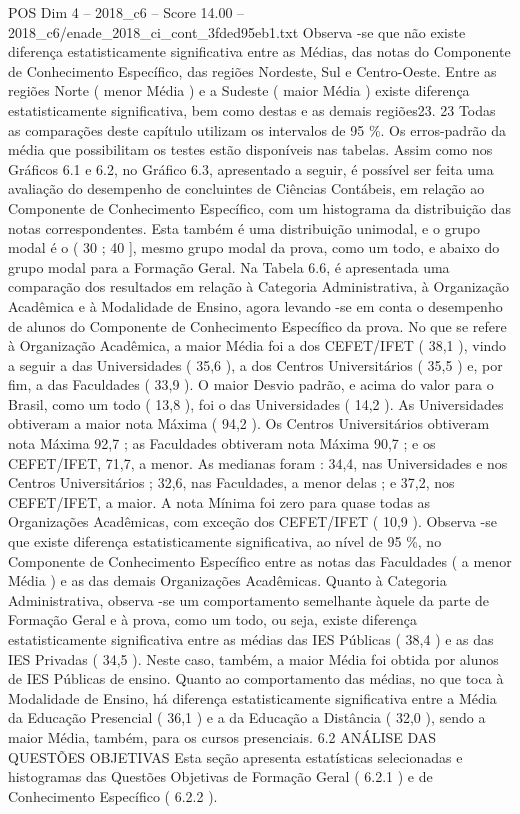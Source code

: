 \begin{textsample}{POS Dim 4 – 2018\_c6 – Score 14.00 – 2018\_c6/enade\_2018\_ci\_cont\_3fded95eb1.txt}
Observa -se que não existe diferença estatisticamente significativa entre as Médias, das notas do Componente de Conhecimento Específico, das regiões Nordeste, Sul e Centro-Oeste.
Entre as regiões Norte ( menor Média ) e a Sudeste ( maior Média ) existe diferença estatisticamente significativa, bem como destas e as demais regiões23. 23 Todas as comparações deste capítulo utilizam os intervalos de 95 \%.
Os erros-padrão da média que possibilitam os testes estão disponíveis nas tabelas.
Assim como nos Gráficos 6.1 e 6.2, no Gráfico 6.3, apresentado a seguir, é possível ser feita uma avaliação do desempenho de concluintes de Ciências Contábeis, em relação ao Componente de Conhecimento Específico, com um histograma da distribuição das notas correspondentes.
Esta também é uma distribuição unimodal, e o grupo modal é o ( 30 ; 40 ], mesmo grupo modal da prova, como um todo, e abaixo do grupo modal para a Formação Geral.
Na Tabela 6.6, é apresentada uma comparação dos resultados em relação à Categoria Administrativa, à Organização Acadêmica e à Modalidade de Ensino, agora levando -se em conta o desempenho de alunos do Componente de Conhecimento Específico da prova.
No que se refere à Organização Acadêmica, a maior Média foi a dos CEFET/IFET ( 38,1 ), vindo a seguir a das Universidades ( 35,6 ), a dos Centros Universitários ( 35,5 ) e, por fim, a das Faculdades ( 33,9 ).
O maior Desvio padrão, e acima do valor para o Brasil, como um todo ( 13,8 ), foi o das Universidades ( 14,2 ).
As Universidades obtiveram a maior nota Máxima ( 94,2 ).
Os Centros Universitários obtiveram nota Máxima 92,7 ; as Faculdades obtiveram nota Máxima 90,7 ; e os CEFET/IFET, 71,7, a menor.
As medianas foram : 34,4, nas Universidades e nos Centros Universitários ; 32,6, nas Faculdades, a menor delas ; e 37,2, nos CEFET/IFET, a maior.
A nota Mínima foi zero para quase todas as Organizações Acadêmicas, com exceção dos CEFET/IFET ( 10,9 ).
Observa -se que existe diferença estatisticamente significativa, ao nível de 95 \%, no Componente de Conhecimento Específico entre as notas das Faculdades ( a menor Média ) e as das demais Organizações Acadêmicas.
Quanto à Categoria Administrativa, observa -se um comportamento semelhante àquele da parte de Formação Geral e à prova, como um todo, ou seja, existe diferença estatisticamente significativa entre as médias das IES Públicas ( 38,4 ) e as das IES Privadas ( 34,5 ).
Neste caso, também, a maior Média foi obtida por alunos de IES Públicas de ensino.
Quanto ao comportamento das médias, no que toca à Modalidade de Ensino, há diferença estatisticamente significativa entre a Média da Educação Presencial ( 36,1 ) e a da Educação a Distância ( 32,0 ), sendo a maior Média, também, para os cursos presenciais. 6.2 ANÁLISE DAS QUESTÕES OBJETIVAS Esta seção apresenta estatísticas selecionadas e histogramas das Questões Objetivas de Formação Geral ( 6.2.1 ) e de Conhecimento Específico ( 6.2.2 ).

\end{textsample}
